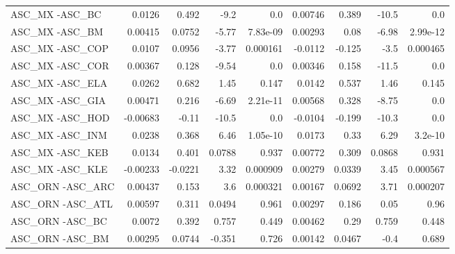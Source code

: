 \begin{tabular}{lrrrrrrrr}
ASC\_MX -ASC\_BC                          &      0.0126 &        0.492 &    -9.2 &      0.0 &    0.00746 &       0.389 &        -10.5 &           0.0 \\
ASC\_MX -ASC\_BM                          &     0.00415 &       0.0752 &   -5.77 & 7.83e-09 &    0.00293 &        0.08 &        -6.98 &      2.99e-12 \\
ASC\_MX -ASC\_COP                         &      0.0107 &       0.0956 &   -3.77 & 0.000161 &    -0.0112 &      -0.125 &         -3.5 &      0.000465 \\
ASC\_MX -ASC\_COR                         &     0.00367 &        0.128 &   -9.54 &      0.0 &    0.00346 &       0.158 &        -11.5 &           0.0 \\
ASC\_MX -ASC\_ELA                         &      0.0262 &        0.682 &    1.45 &    0.147 &     0.0142 &       0.537 &         1.46 &         0.145 \\
ASC\_MX -ASC\_GIA                         &     0.00471 &        0.216 &   -6.69 & 2.21e-11 &    0.00568 &       0.328 &        -8.75 &           0.0 \\
ASC\_MX -ASC\_HOD                         &    -0.00683 &        -0.11 &   -10.5 &      0.0 &    -0.0104 &      -0.199 &        -10.3 &           0.0 \\
ASC\_MX -ASC\_INM                         &      0.0238 &        0.368 &    6.46 & 1.05e-10 &     0.0173 &        0.33 &         6.29 &       3.2e-10 \\
ASC\_MX -ASC\_KEB                         &      0.0134 &        0.401 &  0.0788 &    0.937 &    0.00772 &       0.309 &       0.0868 &         0.931 \\
ASC\_MX -ASC\_KLE                         &    -0.00233 &      -0.0221 &    3.32 & 0.000909 &    0.00279 &      0.0339 &         3.45 &      0.000567 \\
ASC\_ORN -ASC\_ARC                        &     0.00437 &        0.153 &     3.6 & 0.000321 &    0.00167 &      0.0692 &         3.71 &      0.000207 \\
ASC\_ORN -ASC\_ATL                        &     0.00597 &        0.311 &  0.0494 &    0.961 &    0.00297 &       0.186 &         0.05 &          0.96 \\
ASC\_ORN -ASC\_BC                         &      0.0072 &        0.392 &   0.757 &    0.449 &    0.00462 &        0.29 &        0.759 &         0.448 \\
ASC\_ORN -ASC\_BM                         &     0.00295 &       0.0744 &  -0.351 &    0.726 &    0.00142 &      0.0467 &         -0.4 &         0.689 \\

\end{tabular}
